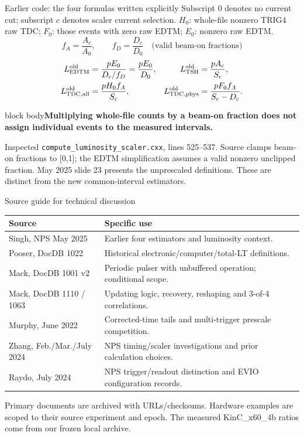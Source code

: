 \documentclass[aspectratio=169,11pt]{beamer}
\newcommand{\source}[1]{\par\vfill{\scriptsize\color{muted}#1\par}}
\newcommand{\takeaway}[1]{\begin{beamercolorbox}[sep=2.5mm,wd=\linewidth]{block body}\textbf{#1}\end{beamercolorbox}}
\begin{document}
\begin{frame}{Earlier code: the four formulas written explicitly}
\small
Subscript 0 denotes no current cut; subscript $c$ denotes scaler current selection. $H_0$: whole-file nonzero TRIG4 raw TDC; $F_0$: those events with zero raw EDTM; $E_0$: nonzero raw EDTM.
\[f_A=\frac{A_c}{A_0},\qquad f_D=\frac{D_c}{D_0}\quad\text{(valid beam-on fractions)}\]
\begin{align*}
L_{\rm EDTM}^{\rm old}&=\frac{pE_0}{D_c/f_D}=\frac{pE_0}{D_0}, &
L_{\rm TSH}^{\rm old}&=\frac{pA_c}{S_c},\\
L_{\rm TDC,all}^{\rm old}&=\frac{pH_0f_A}{S_c}, &
L_{\rm TDC,phys}^{\rm old}&=\frac{pF_0f_A}{S_c-D_c}.
\end{align*}
\takeaway{Multiplying whole-file counts by a beam-on fraction does not assign individual events to the measured intervals.}
\source{Inspected \texttt{compute\_luminosity\_scaler.cxx}, lines 525--537. Source clamps beam-on fractions to [0,1]; the EDTM simplification assumes a valid nonzero unclipped fraction. May 2025 slide 23 presents the unprescaled definitions. These are distinct from the new common-interval estimators.}
\end{frame}

\begin{frame}{Source guide for technical discussion}
\small\renewcommand{\arraystretch}{1.3}
\begin{tabular}{@{}p{}p{}@{}}\toprule
Source & Specific use\\\midrule
Singh, NPS May 2025 & Earlier four estimators and luminosity context.\\
Pooser, DocDB 1022 & Historical electronic/computer/total-LT definitions.\\
Mack, DocDB 1001 v2 & Periodic pulser with unbuffered operation; conditional scope.\\
Mack, DocDB 1110 / 1063 & Updating logic, recovery, reshaping and 3-of-4 correlations.\\
Murphy, June 2022 & Corrected-time tails and multi-trigger prescale competition.\\
Zhang, Feb./Mar./July 2024 & NPS timing/scaler investigations and prior calculation choices.\\
Raydo, July 2024 & NPS trigger/readout distinction and EVIO configuration records.\\\bottomrule
\end{tabular}
\source{Primary documents are archived with URLs/checksums. Hardware examples are scoped to their source experiment and epoch. The measured KinC\_x60\_4b ratios come from our frozen local archive.}
\end{frame}
\end{document}

